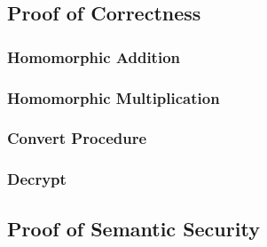 \documentclass{article}
\begin{document}
\subsection{Proof of Correctness}


\subsubsection{Homomorphic Addition}


\subsubsection{Homomorphic Multiplication}


\subsubsection{Convert Procedure}


\subsubsection{Decrypt}


\subsection{Proof of Semantic Security}





\newpage
\thispagestyle{empty}
\end{document}
